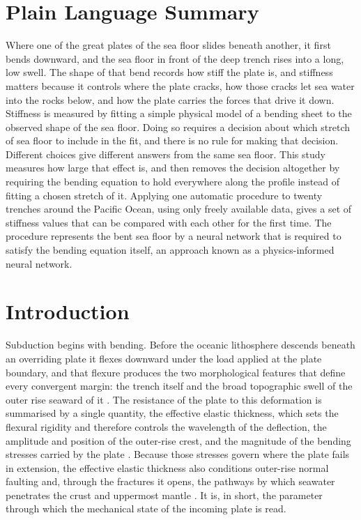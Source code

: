 \documentclass[final]{agujournal2019}
\begin{document}
\section*{Plain Language Summary}
Where one of the great plates of the sea floor slides beneath another, it first
bends downward, and the sea floor in front of the deep trench rises into a long,
low swell. The shape of that bend records how stiff the plate is, and stiffness
matters because it controls where the plate cracks, how those cracks let sea
water into the rocks below, and how the plate carries the forces that drive it
down. Stiffness is measured by fitting a simple physical model of a bending
sheet to the observed shape of the sea floor. Doing so requires a decision about
which stretch of sea floor to include in the fit, and there is no rule for
making that decision. Different choices give different answers from the
same sea floor. This study measures how large that effect is, and then removes
the decision altogether by requiring the bending equation to hold everywhere
along the profile instead of fitting a chosen stretch of it. Applying one
automatic procedure to twenty trenches around the Pacific Ocean, using only
freely available data, gives a set of stiffness values that can be compared with
each other for the first time. The procedure represents the bent sea floor by a
neural network that is required to satisfy the bending equation itself, an
approach known as a physics-informed neural network.

\section{Introduction}\label{sec:intro}

Subduction begins with bending. Before the oceanic lithosphere descends beneath
an overriding plate it flexes downward under the load applied at the plate
boundary, and that flexure produces the two morphological features that define
every convergent margin: the trench itself and the broad topographic swell of
the outer rise seaward of it \cite{Kirby2022Isostasy,Kirby2022Flexure}. The
resistance of the plate to this deformation is summarised by a single quantity,
the effective elastic thickness, which sets the flexural rigidity and therefore
controls the wavelength of the deflection, the amplitude and position of the
outer-rise crest, and the magnitude of the bending stresses carried by the
plate \cite{ContrerasReyesOsses2010,Manriquez2014}. Because those stresses
govern where the plate fails in extension, the effective elastic thickness also
conditions outer-rise normal faulting and, through the fractures it opens, the
pathways by which seawater penetrates the crust and uppermost mantle
\cite{ContrerasReyes2007,Craig2014}. It is, in short, the parameter through
which the mechanical state of the incoming plate is read.
\end{document}
